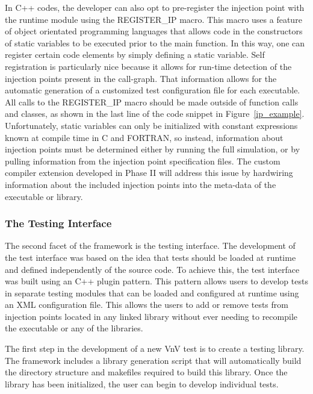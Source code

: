 In C++ codes, the developer can also opt to pre-register the injection point with the runtime module using the REGISTER\_IP macro. This macro uses a feature of object orientated programming languages that allows code in the constructors of static variables to be executed prior to the main function. In this way, one can register certain code elements by simply defining a static variable. Self registration is particularly nice because it allows for run-time detection of the injection points present in the call-graph. That information allows for the automatic generation of a customized test configuration file for each executable. All calls to the REGISTER\_IP macro should be made outside of function calls and classes, as shown in the last line of the code snippet in Figure~\ref{ip_example}. Unfortunately, static variables can only be initialized with constant expressions known at compile time in C and FORTRAN, so instead, information about injection points must be determined either by running the full simulation, or by pulling information from the injection point specification files. The custom compiler extension developed in Phase II will address this issue by hardwiring information about the included injection points into the meta-data of the executable or library. 

\subsubsection{The Testing Interface} 

The second facet of the framework is the \VV testing interface. The development of the 
test interface was based on the idea that tests should be loaded at runtime and defined independently of the source code. To achieve this, the test
interface was built using an C++ plugin pattern. This pattern allows users to develop tests in separate testing modules that can be loaded and configured 
at runtime using an XML configuration file. This allows the users to add or remove tests from injection points located in any linked library without ever 
needing to recompile the executable or any of the libraries. 

The first step in the development of a new VnV test is to create a testing library. The framework includes a library generation script that will automatically build the directory structure and makefiles required to 
build this library. Once the library has been initialized, the user can begin to develop individual tests. 


